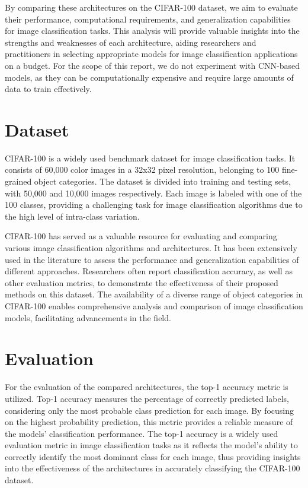 \documentclass{article}
\begin{document}
By comparing these architectures on the CIFAR-100 dataset, we aim to evaluate their performance, computational requirements, and generalization capabilities for image classification tasks.
This analysis will provide valuable insights into the strengths and weaknesses of each architecture, aiding researchers and practitioners in selecting appropriate models for image classification applications on a budget.
For the scope of this report, we do not experiment with CNN-based models, as they can be computationally expensive and require large amounts of data to train effectively.

\section{Dataset}
CIFAR-100 is a widely used benchmark dataset for image classification tasks.
It consists of 60,000 color images in a 32x32 pixel resolution, belonging to 100 fine-grained object categories.
The dataset is divided into training and testing sets, with 50,000 and 10,000 images respectively.
Each image is labeled with one of the 100 classes, providing a challenging task for image classification algorithms due to the high level of intra-class variation.

CIFAR-100 has served as a valuable resource for evaluating and comparing various image classification algorithms and architectures.
It has been extensively used in the literature to assess the performance and generalization capabilities of different approaches.
Researchers often report classification accuracy, as well as other evaluation metrics, to demonstrate the effectiveness of their proposed methods on this dataset.
The availability of a diverse range of object categories in CIFAR-100 enables comprehensive analysis and comparison of image classification models, facilitating advancements in the field.


\section{Evaluation}
For the evaluation of the compared architectures, the top-1 accuracy metric is utilized.
Top-1 accuracy measures the percentage of correctly predicted labels, considering only the most probable class prediction for each image. By focusing on the highest probability prediction, this metric provides a reliable measure of the models' classification performance.
The top-1 accuracy is a widely used evaluation metric in image classification tasks as it reflects the model's ability to correctly identify the most dominant class for each image, thus providing insights into the effectiveness of the architectures in accurately classifying the CIFAR-100 dataset.
\end{document}
